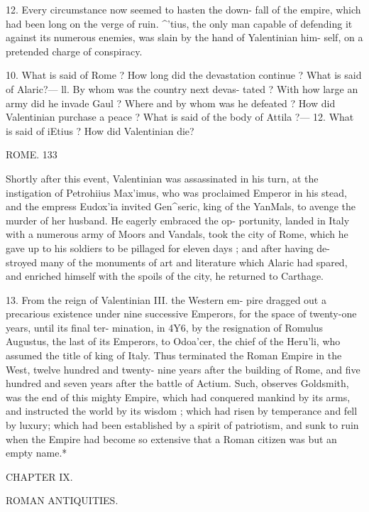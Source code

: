 \documentclass[openany,a4paper]{memoir}
\begin{document}
12. Every circumstance now seemed to hasten the down- 
fall of the empire, which had been long on the verge of ruin. 
^'tius, the only man capable of defending it against its 
numerous enemies, was slain by the hand of Yalentinian him- 
self, on a pretended charge of conspiracy. 

10. What is said of Rome ? How long did the devastation continue ? 
What is said of Alaric?— ll. By whom was the country next devas- 
tated ? With how large an army did he invade Gaul ? Where and 
by whom was he defeated ? How did Valentinian purchase a peace ? 
What is said of the body of Attila ?— 12. What is said of iEtius ? How 
did Valentinian die? 



ROME. 133 

Shortly after this event, Valentinian was assassinated in 
his turn, at the instigation of Petrohiius Max'imus, who 
was proclaimed Emperor in his stead, and the empress 
Eudox'ia invited Gen^seric, king of the YanMals, to avenge 
the murder of her husband. He eagerly embraced the op- 
portunity, landed in Italy with a numerous army of Moors 
and Vandals, took the city of Rome, which he gave up to his 
soldiers to be pillaged for eleven days ; and after having de- 
stroyed many of the monuments of art and literature which 
Alaric had spared, and enriched himself with the spoils of 
the city, he returned to Carthage. 

13. From the reign of Valentinian III. the Western em- 
pire dragged out a precarious existence under nine successive 
Emperors, for the space of twenty-one years, until its final ter- 
mination, in 4Y6, by the resignation of Romulus Augustus, the 
last of its Emperors, to Odoa'cer, the chief of the Heru'li, 
who assumed the title of king of Italy. Thus terminated 
the Roman Empire in the West, twelve hundred and twenty- 
nine years after the building of Rome, and five hundred and 
seven years after the battle of Actium. Such, observes 
Goldsmith, was the end of this mighty Empire, which had 
conquered mankind by its arms, and instructed the world 
by its wisdom ; which had risen by temperance and fell by 
luxury; which had been established by a spirit of patriotism, 
and sunk to ruin when the Empire had become so extensive 
that a Roman citizen was but an empty name.* 



CHAPTER IX. 

ROMAN ANTIQUITIES. 
\end{document}

